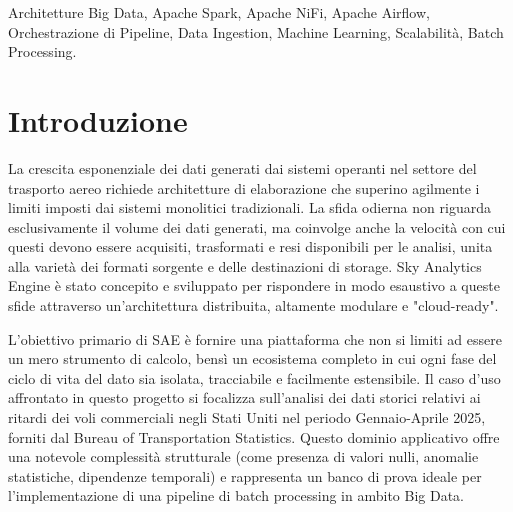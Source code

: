 \documentclass[conference]{IEEEtran}
\begin{document}

\begin{IEEEkeywords}
Architetture Big Data, Apache Spark, Apache NiFi, Apache Airflow, Orchestrazione di Pipeline, Data Ingestion, Machine Learning, Scalabilità, Batch Processing.
\end{IEEEkeywords}




\section{Introduzione}\label{sec:introduction}
La crescita esponenziale dei dati generati dai sistemi operanti nel settore del trasporto aereo richiede architetture di elaborazione che superino agilmente i limiti imposti dai sistemi monolitici tradizionali.
La sfida odierna non riguarda esclusivamente il volume dei dati generati, ma coinvolge anche la velocità con cui questi devono essere acquisiti, trasformati e resi disponibili per le analisi, unita alla varietà dei formati sorgente e delle destinazioni di storage.
Sky Analytics Engine è stato concepito e sviluppato per rispondere in modo esaustivo a queste sfide attraverso un'architettura distribuita, altamente modulare e "cloud-ready".

L'obiettivo primario di SAE è fornire una piattaforma che non si limiti ad essere un mero strumento di calcolo, bensì un ecosistema completo in cui ogni fase del ciclo di vita del dato sia isolata, tracciabile e facilmente estensibile.
Il caso d'uso affrontato in questo progetto si focalizza sull'analisi dei dati storici relativi ai ritardi dei voli commerciali negli Stati Uniti nel periodo Gennaio-Aprile 2025, forniti dal Bureau of Transportation Statistics.
Questo dominio applicativo offre una notevole complessità strutturale (come presenza di valori nulli, anomalie statistiche, dipendenze temporali) e rappresenta un banco di prova ideale per l'implementazione di una pipeline di batch processing in ambito Big Data.
\end{document}
